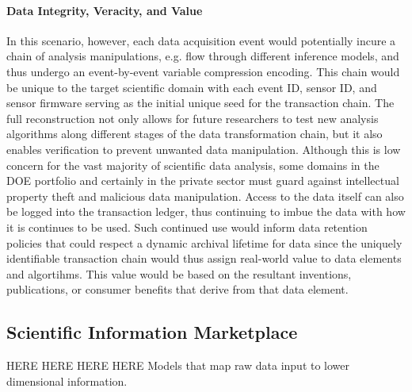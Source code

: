 \documentclass{article}
\begin{document}
\paragraph{Data Integrity, Veracity, and Value} 
In this scenario, however, each data acquisition event would potentially incure a chain of analysis manipulations, e.g. flow through different inference models, and thus undergo an event-by-event variable compression encoding.
This chain would be unique to the target scientific domain with each event ID, sensor ID, and sensor firmware serving as the initial unique seed for the transaction chain.
The full reconstruction not only allows for future researchers to test new analysis algorithms along different stages of the data transformation chain, but it also enables verification to prevent unwanted data manipulation.  %
Although this is low concern for the vast majority of scientific data analysis, some domains in the DOE portfolio and certainly in the private sector must guard against intellectual property theft and malicious data manipulation.
Access to the data itself can also be logged into the transaction ledger, thus continuing to imbue the data with how it is continues to be used.
Such continued use would inform data retention policies that could respect a dynamic archival lifetime for data since the uniquely identifiable transaction chain would thus assign real-world value to data elements and algortihms.
This value would be based on the resultant inventions, publications, or consumer benefits that derive from that data element.





\subsection{Scientific Information Marketplace} HERE HERE HERE HERE
Models that map raw data input to lower dimensional information. 
\end{document}
